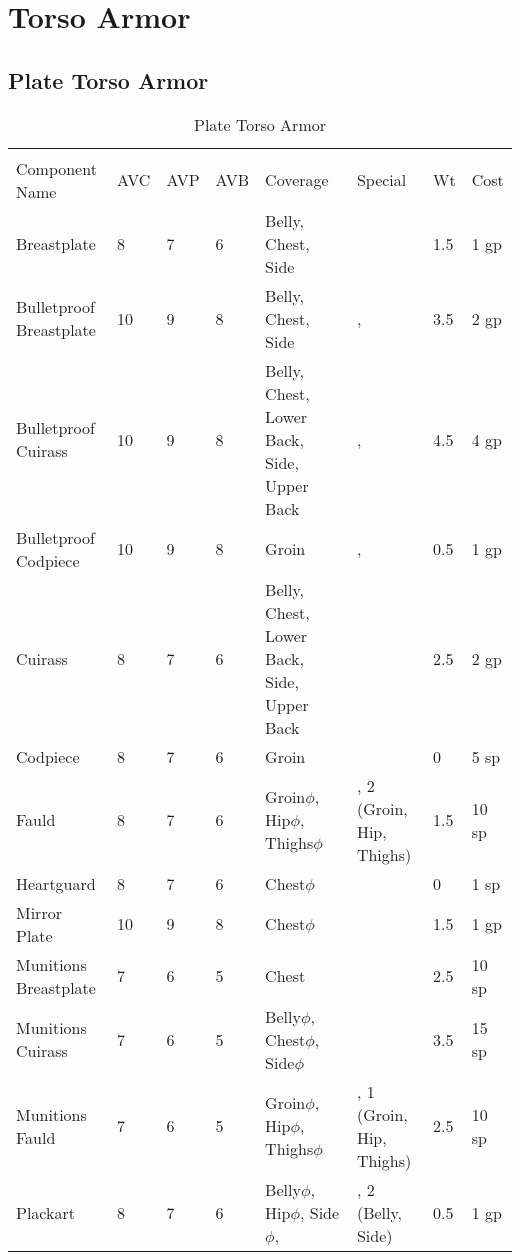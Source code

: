 \documentclass[oneside,11pt,english]{book}
\begin{document}
\section{Torso Armor}
\subsection{Plate Torso Armor}
\begin{longtabu} to 
	\captionsetup{textformat=empty, labelformat=blank}
	\caption{Plate Torso Armor} \vspace{-15pt}
	\label{tab:Plate Torso Armor}\\
Component Name&AVC&AVP&AVB& Coverage& Special& Wt&Cost\\\toprule
Breastplate& 8& 7& 6& Belly, Chest, Side& & 1.5& 1 gp\\
Bulletproof Breastplate& 10& 9& 8& Belly, Chest, Side& , & 3.5& 2 gp\\
Bulletproof Cuirass& 10& 9& 8& Belly, Chest, Lower Back, Side, Upper Back& , & 4.5& 4 gp\\
Bulletproof Codpiece& 10& 9& 8& Groin& , & 0.5& 1 gp\\
Cuirass& 8& 7& 6& Belly, Chest, Lower Back, Side, Upper Back& & 2.5& 2 gp\\
Codpiece& 8& 7& 6& Groin& & 0& 5 sp\\
Fauld& 8& 7& 6& Groin\hyperref[sec:Weak Spots]{$\phi$}, Hip\hyperref[sec:Weak Spots]{$\phi$}, Thighs\hyperref[sec:Weak Spots]{$\phi$}& ,  2 (Groin, Hip, Thighs)& 1.5& 10 sp\\
Heartguard& 8& 7& 6& Chest\hyperref[sec:Weak Spots]{$\phi$}& & 0& 1 sp\\
Mirror Plate& 10& 9& 8& Chest\hyperref[sec:Weak Spots]{$\phi$}& & 1.5& 1 gp\\
Munitions Breastplate& 7& 6& 5& Chest& & 2.5& 10 sp\\
Munitions Cuirass& 7& 6& 5& Belly\hyperref[sec:Weak Spots]{$\phi$}, Chest\hyperref[sec:Weak Spots]{$\phi$}, Side\hyperref[sec:Weak Spots]{$\phi$}& & 3.5& 15 sp\\
Munitions Fauld& 7& 6& 5& Groin\hyperref[sec:Weak Spots]{$\phi$}, Hip\hyperref[sec:Weak Spots]{$\phi$}, Thighs\hyperref[sec:Weak Spots]{$\phi$}& ,  1 (Groin, Hip, Thighs)& 2.5& 10 sp\\
Plackart& 8& 7& 6& Belly\hyperref[sec:Weak Spots]{$\phi$}, Hip\hyperref[sec:Weak Spots]{$\phi$}, Side\hyperref[sec:Weak Spots]{$\phi$},& ,  2 (Belly, Side)& 0.5& 1 gp\\
\end{longtabu}
\end{document}
